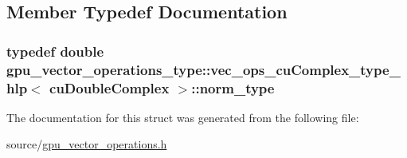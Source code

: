 \subsection{Member Typedef Documentation}
\hypertarget{structgpu__vector__operations__type_1_1vec__ops__cuComplex__type__hlp_3_01cuDoubleComplex_01_4_a4d17e695719bc675d33dc12fced06c66}{
\subsubsection[{norm\-\_\-type}]{\setlength{\rightskip}{0pt plus 5cm}typedef double {\bf gpu\-\_\-vector\-\_\-operations\-\_\-type\-::vec\-\_\-ops\-\_\-cu\-Complex\-\_\-type\-\_\-hlp}$<$ cu\-Double\-Complex $>$\-::{\bf norm\-\_\-type}}}\label{structgpu__vector__operations__type_1_1vec__ops__cuComplex__type__hlp_3_01cuDoubleComplex_01_4_a4d17e695719bc675d33dc12fced06c66}


The documentation for this struct was generated from the following file\-:\begin{DoxyCompactItemize}
\item 
source/\hyperlink{gpu__vector__operations_8h}{gpu\-\_\-vector\-\_\-operations.\-h}\end{DoxyCompactItemize}
